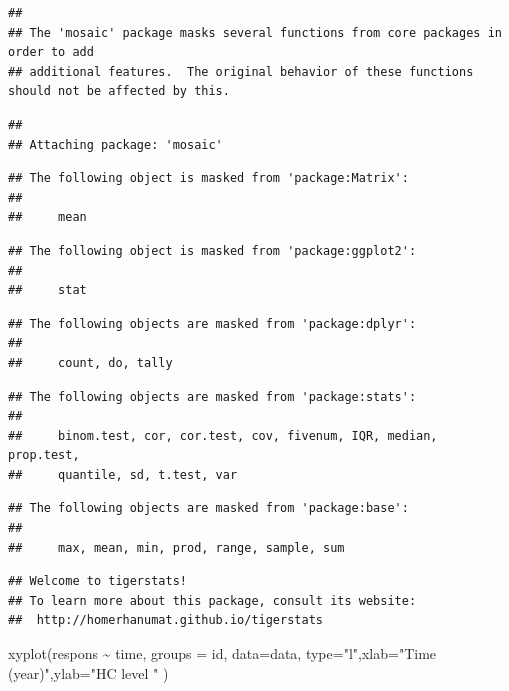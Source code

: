 \documentclass[
]{article}
\newenvironment{Shaded}{\begin{snugshade}}{\end{snugshade}}
\newcommand{\AttributeTok}[1]{\textcolor[rgb]{0.77,0.63,0.00}{#1}}
\newcommand{\FunctionTok}[1]{\textcolor[rgb]{0.00,0.00,0.00}{#1}}
\newcommand{\NormalTok}[1]{#1}
\newcommand{\SpecialCharTok}[1]{\textcolor[rgb]{0.00,0.00,0.00}{#1}}
\newcommand{\StringTok}[1]{\textcolor[rgb]{0.31,0.60,0.02}{#1}}
\begin{document}
\begin{verbatim}
## 
## The 'mosaic' package masks several functions from core packages in order to add 
## additional features.  The original behavior of these functions should not be affected by this.
\end{verbatim}

\begin{verbatim}
## 
## Attaching package: 'mosaic'
\end{verbatim}

\begin{verbatim}
## The following object is masked from 'package:Matrix':
## 
##     mean
\end{verbatim}

\begin{verbatim}
## The following object is masked from 'package:ggplot2':
## 
##     stat
\end{verbatim}

\begin{verbatim}
## The following objects are masked from 'package:dplyr':
## 
##     count, do, tally
\end{verbatim}

\begin{verbatim}
## The following objects are masked from 'package:stats':
## 
##     binom.test, cor, cor.test, cov, fivenum, IQR, median, prop.test,
##     quantile, sd, t.test, var
\end{verbatim}

\begin{verbatim}
## The following objects are masked from 'package:base':
## 
##     max, mean, min, prod, range, sample, sum
\end{verbatim}

\begin{verbatim}
## Welcome to tigerstats!
## To learn more about this package, consult its website:
##  http://homerhanumat.github.io/tigerstats
\end{verbatim}

\begin{Shaded}
\begin{Highlighting}[]
\FunctionTok{xyplot}\NormalTok{(respons }\SpecialCharTok{\textasciitilde{}}\NormalTok{ time, }\AttributeTok{groups =}\NormalTok{ id, }\AttributeTok{data=}\NormalTok{data, }\AttributeTok{type=}\StringTok{"l"}\NormalTok{,}\AttributeTok{xlab=}\StringTok{"Time (year)"}\NormalTok{,}\AttributeTok{ylab=}\StringTok{"HC level "}\NormalTok{ )}
\end{Highlighting}
\end{Shaded}
\end{document}

